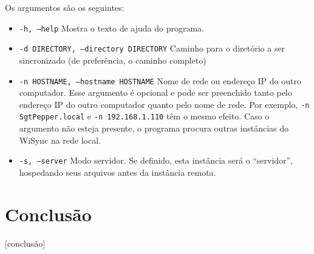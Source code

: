 \documentclass[12pt,a4paper]{ufpr}
\begin{document}
Os argumentos são os seguintes:
\begin{itemize}
  \item \texttt{-h, --help} Mostra o texto de ajuda do programa.
  \item \texttt{-d DIRECTORY, --directory DIRECTORY} Caminho para o diretório a ser sincronizado (de preferência, o caminho completo)
  \item \texttt{-n HOSTNAME, --hostname HOSTNAME} Nome de rede ou endereço IP do outro computador. Esse argumento é opcional e pode ser preenchido tanto pelo endereço IP do outro computador quanto pelo nome de rede. Por exemplo, \texttt{-n SgtPepper.local} e \texttt{-n 192.168.1.110} têm o mesmo efeito. Caso o argumento não esteja presente, o programa procura outras instâncias do WiSync na rede local.
  \item \texttt{-s, --server} Modo servidor. Se definido, esta instância será o ``servidor'', hospedando seus arquivos antes da instância remota.
\end{itemize}


\chapter{Conclusão}
\label{conclusao}

[conclusão]

%


%
%

\singlespacing
\end{document}

